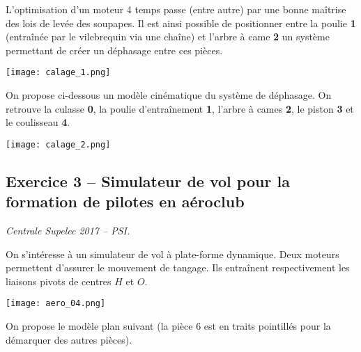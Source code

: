 \begin{multicols}{2}
L'optimisation d'un moteur 4 temps passe (entre autre) par une bonne maîtrise des lois de levée des soupapes. Il est ainsi possible de positionner entre la poulie \textbf{1} (entraînée par le vilebrequin via une chaîne) et l'arbre à came  \textbf{2} un système permettant de créer un déphasage entre ces pièces. 

\begin{center}
\texttt{[image: calage\_1.png]}
\end{center}

On propose ci-dessous un modèle cinématique du système de déphasage. On retrouve la culasse \textbf{0}, la poulie d’entraînement \textbf{1}, l'arbre à cames \textbf{2}, le piston \textbf{3} et le coulisseau \textbf{4}. 


\begin{center}
\texttt{[image: calage\_2.png]}
\end{center}

\ifprof
\begin{corrige}
\end{corrige}\else\fi

\ifprof
\begin{corrige}
\end{corrige}\else\fi

\subsection*{Exercice 3 -- Simulateur de vol pour la formation de pilotes en aéroclub}
\setcounter{exo}{0}
\begin{flushright}
\textit{Centrale Supelec 2017 -- PSI.}
\end{flushright}
On s’intéresse à un simulateur de vol à plate-forme dynamique. 
%
Deux moteurs permettent d'assurer le mouvement de tangage.  Ils entraînent respectivement les liaisons pivots de centres $H$ et $O$. 

\begin{center}
\texttt{[image: aero\_04.png]}
\end{center}

On propose le modèle plan suivant (la pièce 6 est en traits pointillés pour la démarquer des autres pièces).


\end{multicols}
